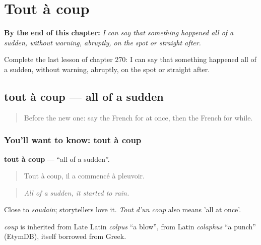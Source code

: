 
\chapter{Tout à coup}
\label{ch:fr-tout-a-coup}

\begin{chapteropening}
\textbf{By the end of this chapter:} \emph{I can say that something happened all of a sudden, without warning, abruptly, on the spot or straight after.}

Complete the last lesson of chapter 270: I can say that something happened all of a sudden, without warning, abruptly, on the spot or straight after.
\end{chapteropening}

\section[tout à coup]{tout à coup — all of a sudden}

\label{lesson:FR-C270-tout-a-coup}



\begin{quote}
Before the new one: say the French for at once, then the French for while.
\end{quote}

\subsection*{You'll want to know: tout à coup}
\textbf{tout à coup} — \textquotedblleft{}all of a sudden\textquotedblright{}.

\begin{quote}
Tout à coup, il a commencé à pleuvoir.
\end{quote}

\begin{quote}
\emph{All of a sudden, it started to rain.}
\end{quote}

Close to \emph{soudain}; storytellers love it. \emph{Tout d'un coup} also means 'all at once'.

\begin{cousinweb}
\emph{coup} is inherited from Late Latin \emph{colpus} \textquotedblleft{}a blow\textquotedblright{}, from Latin \emph{colaphus} \textquotedblleft{}a punch\textquotedblright{} (EtymDB), itself borrowed from Greek.
\end{cousinweb}

